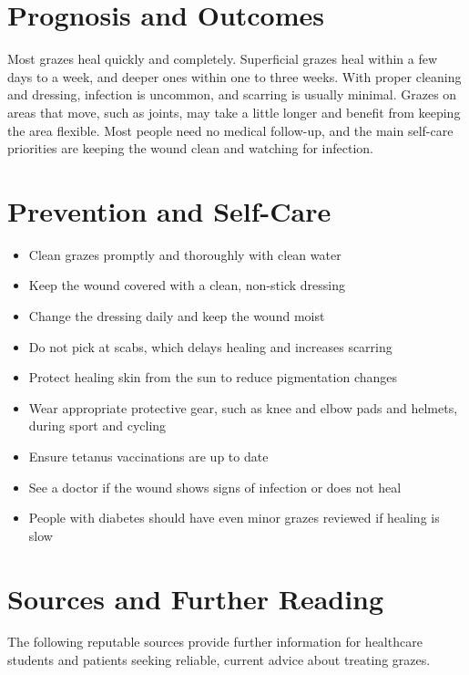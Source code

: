\section*{Prognosis and Outcomes}
Most grazes heal quickly and completely. Superficial grazes heal within a few days to a week, and deeper ones within one to three weeks. With proper cleaning and dressing, infection is uncommon, and scarring is usually minimal. Grazes on areas that move, such as joints, may take a little longer and benefit from keeping the area flexible. Most people need no medical follow-up, and the main self-care priorities are keeping the wound clean and watching for infection.

\section*{Prevention and Self-Care}
\begin{itemize}
    \item Clean grazes promptly and thoroughly with clean water
    \item Keep the wound covered with a clean, non-stick dressing
    \item Change the dressing daily and keep the wound moist
    \item Do not pick at scabs, which delays healing and increases scarring
    \item Protect healing skin from the sun to reduce pigmentation changes
    \item Wear appropriate protective gear, such as knee and elbow pads and helmets, during sport and cycling
    \item Ensure tetanus vaccinations are up to date
    \item See a doctor if the wound shows signs of infection or does not heal
    \item People with diabetes should have even minor grazes reviewed if healing is slow
\end{itemize}

\section*{Sources and Further Reading}
The following reputable sources provide further information for healthcare students and patients seeking reliable, current advice about treating grazes.

